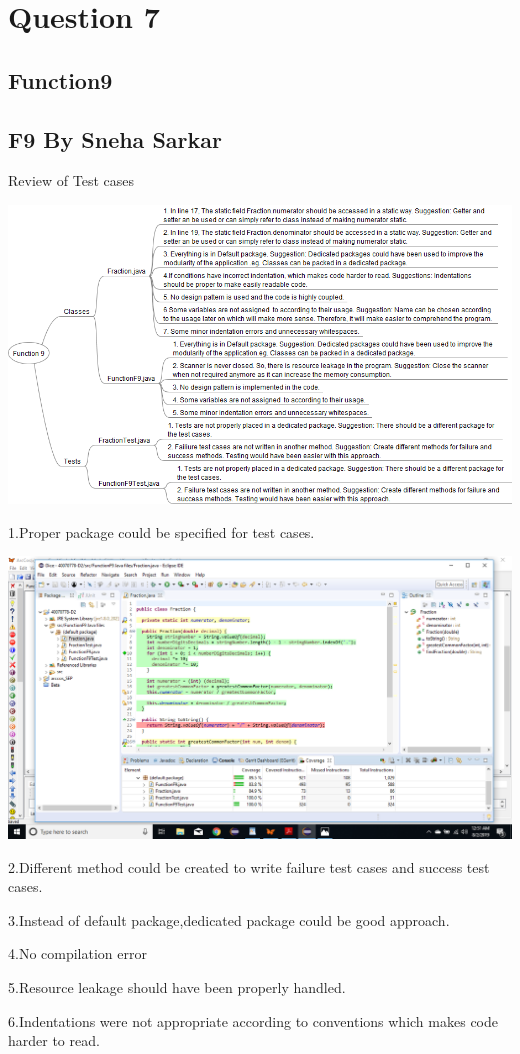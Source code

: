 \documentclass[
	12pt, %
]{fphw}
\begin{document}

\section*{Question 7}
\subsection*{Function9}
\subsection*{F9 By Sneha Sarkar}
\begin{problem}
	Review of Test cases
\end{problem}
\begin{center} \includegraphics[width=0.5\columnwidth]{Function9Sarkar.png} %
\end{center}
\item 1.Proper package could be specified for test cases.
\begin{center} \includegraphics[width=0.5\columnwidth]{SarkarDefaultP.png} %
\end{center}
\item 2.Different method could be created to write failure test cases and success test cases.
\item 3.Instead of default package,dedicated package could be good approach.
\item 4.No compilation error
\item 5.Resource leakage should have been properly handled.
\item 6.Indentations were not appropriate according to conventions which makes code harder to read.
\end{document}
